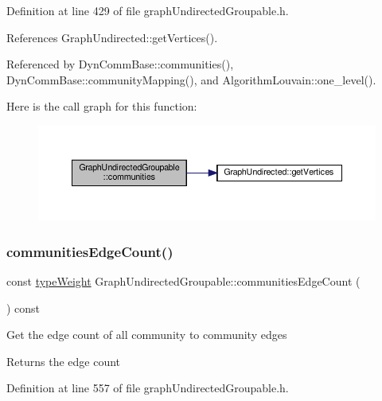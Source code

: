 Definition at line 429 of file graph\+Undirected\+Groupable.\+h.



References Graph\+Undirected\+::get\+Vertices().



Referenced by Dyn\+Comm\+Base\+::communities(), Dyn\+Comm\+Base\+::community\+Mapping(), and Algorithm\+Louvain\+::one\+\_\+level().

Here is the call graph for this function\+:
\nopagebreak
\begin{figure}[H]
\begin{center}
\leavevmode
\includegraphics[width=350pt]{classGraphUndirectedGroupable_a57f8ea4cff0d83b80cca2dc8e8e19ff6_cgraph}
\end{center}
\end{figure}
\mbox{\label{classGraphUndirectedGroupable_a71de0c0e2157841bb1526c321277449a}} 
\subsubsection{\texorpdfstring{communities\+Edge\+Count()}{communitiesEdgeCount()}}
{\footnotesize\ttfamily const \hyperlink{edge_8h_a2e7ea3be891ac8b52f749ec73fee6dd2}{type\+Weight} Graph\+Undirected\+Groupable\+::communities\+Edge\+Count (\begin{DoxyParamCaption}{ }\end{DoxyParamCaption}) const\hspace{0.3cm}{\ttfamily [inline]}}

Get the edge count of all community to community edges

\begin{DoxyReturn}{Returns}
the edge count 
\end{DoxyReturn}


Definition at line 557 of file graph\+Undirected\+Groupable.\+h.



